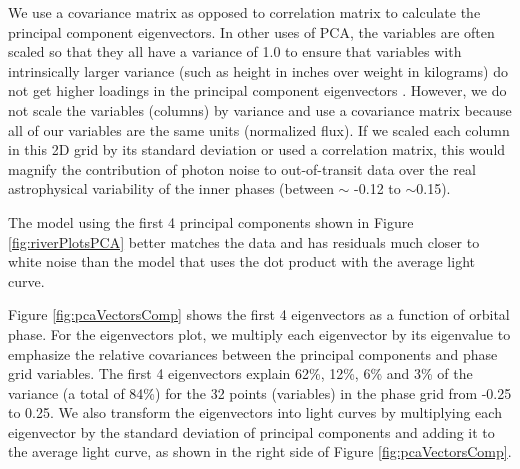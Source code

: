 \documentclass[preprint,trackchanges]{aastex61}
\begin{document}
We use a covariance matrix as opposed to correlation matrix to calculate the principal component eigenvectors.
In other uses of PCA, the variables are often scaled so that they all have a variance of 1.0 to ensure that variables with intrinsically larger variance (such as height in inches over weight in kilograms) do not get higher loadings in the principal component eigenvectors \citep{jolliffe2002pca}.
However, we do not scale the variables (columns) by variance and use a covariance matrix because all of our variables are the same units (normalized flux).
If we scaled each column in this 2D grid by its standard deviation or used a correlation matrix, this would magnify the contribution of photon noise to out-of-transit data over the real astrophysical variability of the inner phases (between $\sim$ -0.12 to $\sim$0.15).

The model using the first 4 principal components shown in Figure \ref{fig:riverPlotsPCA}  better matches the data and has residuals much closer to white noise than the model that uses the dot product with the average light curve.

Figure \ref{fig:pcaVectorsComp} shows the first 4 eigenvectors as a function of orbital phase.
For the eigenvectors plot, we multiply each eigenvector by its eigenvalue to emphasize the relative covariances between the principal components and phase grid variables.
The first 4 eigenvectors explain 62\%, 12\%, 6\% and 3\% of the variance (a total of 84\%) for the 32 points (variables) in the phase grid from -0.25 to 0.25.
We also transform the eigenvectors into light curves by multiplying each eigenvector by the standard deviation of principal components and adding it to the average light curve, as shown in the right side of Figure \ref{fig:pcaVectorsComp}.
\end{document}
